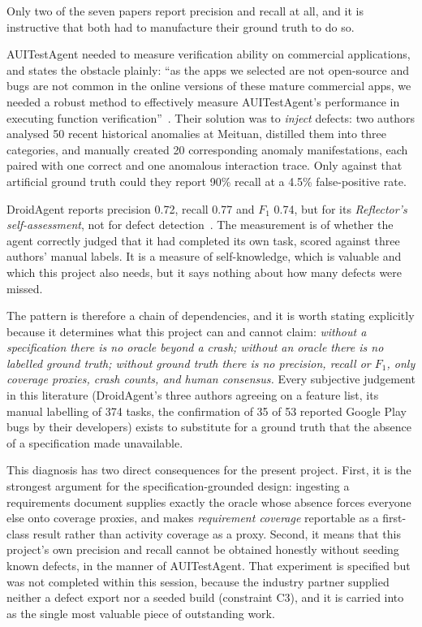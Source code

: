 Only two of the seven papers report precision and recall at all, and it is
instructive that both had to manufacture their ground truth to do so.

AUITestAgent needed to measure verification ability on commercial applications,
and states the obstacle plainly: ``as the apps we selected are not open-source
and bugs are not common in the online versions of these mature commercial apps,
we needed a robust method to effectively measure AUITestAgent's performance in
executing function verification''~\cite{auitestagent}. Their solution was to
\emph{inject} defects: two authors analysed 50 recent historical anomalies at
Meituan, distilled them into three categories, and manually created 20
corresponding anomaly manifestations, each paired with one correct and one
anomalous interaction trace. Only against that artificial ground truth could
they report 90\% recall at a 4.5\% false-positive rate.

DroidAgent reports precision 0.72, recall 0.77 and $F_1$ 0.74, but for its
\emph{Reflector's self-assessment}, not for defect detection~\cite{droidagent}.
The measurement is of whether the agent correctly judged that it had completed
its own task, scored against three authors' manual labels. It is a measure of
self-knowledge, which is valuable and which this project also needs, but it
says nothing about how many defects were missed.

The pattern is therefore a chain of dependencies, and it is worth stating
explicitly because it determines what this project can and cannot claim:
\emph{without a specification there is no oracle beyond a crash; without an
oracle there is no labelled ground truth; without ground truth there is no
precision, recall or $F_1$, only coverage proxies, crash counts, and human
consensus.} Every subjective judgement in this literature (DroidAgent's three
authors agreeing on a feature list, its manual labelling of 374 tasks, the
confirmation of 35 of 53 reported Google Play bugs by their developers) exists
to substitute for a ground truth that the absence of a specification made
unavailable.

This diagnosis has two direct consequences for the present project. First, it
is the strongest argument for the specification-grounded design: ingesting a
requirements document supplies exactly the oracle whose absence forces everyone
else onto coverage proxies, and makes \emph{requirement coverage} reportable as
a first-class result rather than activity coverage as a proxy. Second, it means
that this project's own precision and recall cannot be obtained honestly
without seeding known defects, in the manner of AUITestAgent. That experiment
is specified but was not completed within this session, because the industry
partner supplied neither a defect export nor a seeded build (constraint C3),
and it is carried into  as the single most valuable piece
of outstanding work.

